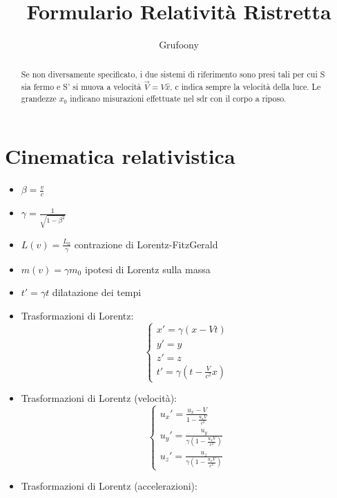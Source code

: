 \documentclass[a4paper]{article}
\begin{document}
	\title{Formulario Relatività Ristretta}
	\author{Grufoony}
	\maketitle
    \begin{abstract}
        Se non diversamente specificato, i due sistemi di riferimento sono presi tali per cui S sia fermo e S' si muova a velocità $\vec{V}=V\hat{x}$.
        c indica sempre la velocità della luce. Le grandezze $x_0$ indicano misurazioni effettuate nel sdr con il corpo a riposo.
    \end{abstract}
    \section{Cinematica relativistica}
        \begin{itemize}
            \item $\beta=\frac{v}{c}$
            \item $\gamma=\frac{1}{\sqrt{1-\beta^2}}$
            \item $L(v)=\frac{L_0}{\gamma}$ contrazione di Lorentz-FitzGerald
            \item $m(v)=\gamma m_0$ ipotesi di Lorentz sulla massa
            \item $t'=\gamma t$ dilatazione dei tempi
            \item Trasformazioni di Lorentz:\\
                $$\begin{cases}
                    x'=\gamma(x-Vt)\\
                    y'=y\\
                    z'=z\\
                    t'=\gamma\left(t-\frac{V}{c^2}x\right)
                \end{cases}$$
            \item Trasformazioni di Lorentz (velocità):\\
                $$\begin{cases}
                    u_x'=\frac{u_x-V}{1-\frac{u_xV}{c^2}}\\
                    u_y'=\frac{u_y}{\gamma\left(1-\frac{u_xV}{c^2}\right)}\\
                    u_z'=\frac{u_z}{\gamma\left(1-\frac{u_xV}{c^2}\right)}
                \end{cases}$$
            \item Trasformazioni di Lorentz (accelerazioni):\\

\end{itemize}
\end{document}
